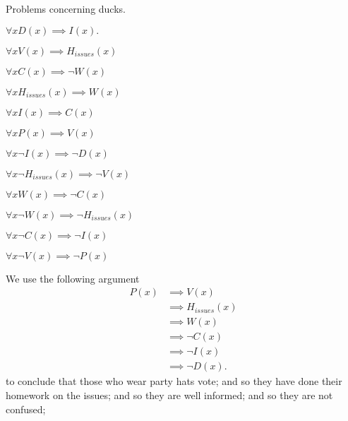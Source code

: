 \documentclass[letter]{article}
\newenvironment{menumerate}{%
  \edef\backupindent{\the\parindent}%
  \enumerate%
  \setlength{\parindent}{\backupindent}%
}{\endenumerate}
\begin{document}
\begin{menumerate}
      \item Problems concerning ducks.
      \begin{menumerate}
        \item
          \begin{menumerate}
           \item $\forall x D(x) \implies  I(x).$
           \item $\forall x V(x) \implies H_{issues}(x)$
           \item $\forall x C(x) \implies \neg W(x)$
           \item $\forall x H_{issues}(x) \implies W(x)$
           \item $\forall x  I(x) \implies C(x)$
           \item $\forall x P(x) \implies V(x) $
          \end{menumerate}
        \item 
          \begin{menumerate}
           \item $\forall x  \neg I(x) \implies \neg D(x)$
           \item $\forall x \neg H_{issues}(x) \implies \neg V(x)$
           \item $\forall x  W(x) \implies \neg C(x)$
           \item $\forall x \neg W(x) \implies \neg H_{issues}(x) $
           \item $\forall x \neg C(x) \implies \neg I(x)$
           \item $\forall x \neg V(x) \implies \neg P(x) $
          \end{menumerate}
        \item We use the following argument
        \begin{equation*}
          \begin{aligned}
            P(x) &\implies V(x) \\
            &\implies H_{issues}(x) \\
            &\implies W(x) \\
            &\implies \neg C(x) \\
            &\implies \neg I(x) \\
            &\implies \neg D(x).
          \end{aligned}
        \end{equation*}
        to conclude that those who wear party hats vote; and so
        they have done their homework on the issues; and so
        they are well informed; and so they are not confused;

\end{menumerate}
\end{menumerate}
\end{document}
